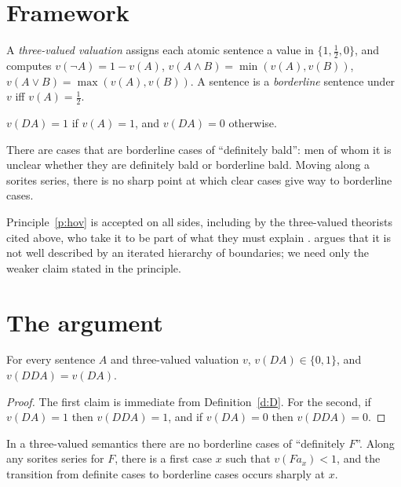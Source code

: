 \documentclass{situationist-preprint}
\begin{document}
\section{Framework}

\begin{definition}\label{d:k3}
A \emph{three-valued valuation} assigns each atomic sentence a value in $\{1, \tfrac12, 0\}$, and computes $v(\neg A) = 1 - v(A)$, $v(A \wedge B) = \min(v(A), v(B))$, $v(A \vee B) = \max(v(A), v(B))$. A sentence is a \emph{borderline} sentence under $v$ iff $v(A) = \tfrac12$.
\end{definition}

\begin{definition}[Definiteness]\label{d:D}
$v(DA) = 1$ if $v(A) = 1$, and $v(DA) = 0$ otherwise.
\end{definition}

\begin{principle}\label{p:hov}
There are cases that are borderline cases of \enquote{definitely bald}: men of whom it is unclear whether they are definitely bald or borderline bald. Moving along a sorites series, there is no sharp point at which clear cases give way to borderline cases.
\end{principle}

Principle~\ref{p:hov} is accepted on all sides, including by the three-valued theorists cited above, who take it to be part of what they must explain \citep{Tye1994,Keefe2000}. \citet{Sainsbury1991} argues that it is not well described by an iterated hierarchy of boundaries; we need only the weaker claim stated in the principle.

\section{The argument}

\begin{lemma}\label{l:bivalent}
For every sentence $A$ and three-valued valuation $v$, $v(DA) \in \{0, 1\}$, and $v(DDA) = v(DA)$.
\end{lemma}

\begin{proof}
The first claim is immediate from Definition~\ref{d:D}. For the second, if $v(DA) = 1$ then $v(DDA) = 1$, and if $v(DA) = 0$ then $v(DDA) = 0$.
\end{proof}

\begin{theorem}\label{t:sharp}
In a three-valued semantics there are no borderline cases of \enquote{definitely $F$}. Along any sorites series for $F$, there is a first case $x$ such that $v(F a_x) < 1$, and the transition from definite cases to borderline cases occurs sharply at $x$.
\end{theorem}
\end{document}
